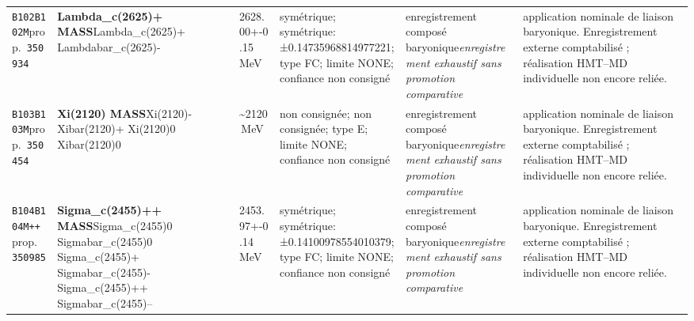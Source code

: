 \begin{landscape}
\begin{longtable}{L{1.85cm}L{4.45cm}L{2.35cm}L{4.05cm}L{3.35cm}L{7.15cm}}
\texttt{B102}\newline \texttt{B102M}\newline prop.\ \texttt{350934} & \textbf{Lambda\_\allowbreak{}c(2625)+ MASS}\newline Lambda\_\allowbreak{}c(2625)+ \textbar{}\allowbreak{} Lambdabar\_\allowbreak{}c(2625)- & 2628.00+-0.15\,MeV & symétrique; symétrique: ±0.14735968814977221; type FC; limite NONE; confiance non consigné & enregistrement composé baryonique\newline \emph{enregistrement exhaustif sans promotion comparative} & application nominale de liaison baryonique. Enregistrement externe comptabilisé ; réalisation HMT--MD individuelle non encore reliée. \\
\texttt{B103}\newline \texttt{B103M}\newline prop.\ \texttt{350454} & \textbf{Xi(2120) MASS}\newline Xi(2120)- \textbar{}\allowbreak{} Xibar(2120)+ \textbar{}\allowbreak{} Xi(2120)0 \textbar{}\allowbreak{} Xibar(2120)0 & \textasciitilde{}2120\,MeV & non consignée; non consignée; type E; limite NONE; confiance non consigné & enregistrement composé baryonique\newline \emph{enregistrement exhaustif sans promotion comparative} & application nominale de liaison baryonique. Enregistrement externe comptabilisé ; réalisation HMT--MD individuelle non encore reliée. \\
\texttt{B104}\newline \texttt{B104M++}\newline prop.\ \texttt{350985} & \textbf{Sigma\_\allowbreak{}c(2455)++ MASS}\newline Sigma\_\allowbreak{}c(2455)0 \textbar{}\allowbreak{} Sigmabar\_\allowbreak{}c(2455)0 \textbar{}\allowbreak{} Sigma\_\allowbreak{}c(2455)+ \textbar{}\allowbreak{} Sigmabar\_\allowbreak{}c(2455)- \textbar{}\allowbreak{} Sigma\_\allowbreak{}c(2455)++ \textbar{}\allowbreak{} Sigmabar\_\allowbreak{}c(2455)-- & 2453.97+-0.14\,MeV & symétrique; symétrique: ±0.14100978554010379; type FC; limite NONE; confiance non consigné & enregistrement composé baryonique\newline \emph{enregistrement exhaustif sans promotion comparative} & application nominale de liaison baryonique. Enregistrement externe comptabilisé ; réalisation HMT--MD individuelle non encore reliée. \\

\end{longtable}
\end{landscape}
